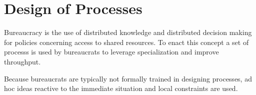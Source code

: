 \section{Design of Processes}
    Bureaucracy is the use of distributed knowledge and distributed decision making for policies concerning access to shared resources. To enact this concept a set of \glspl{process} is used by \glspl{bureaucrat} to leverage specialization and improve throughput. 
    
    Because bureaucrats are typically not formally trained in designing processes, ad hoc ideas reactive to the immediate situation and local constraints are used. 
    
        
        
         